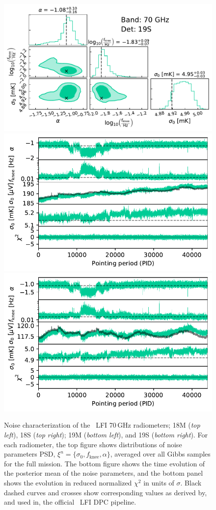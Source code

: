 \documentclass{aa}
\begin{document}
\begin{figure}[p]
\begin{center}
                \includegraphics[width=0.495\linewidth]{figs/corner_band_070_det_4_mean_new.pdf}\\
                \includegraphics[width=0.495\linewidth]{figs/xi_vs_pid_band_070_det_3_mean_new.pdf}
                \includegraphics[width=0.495\linewidth]{figs/xi_vs_pid_band_070_det_4_mean_new.pdf}
                 \vspace*{-4.9mm}            
        \end{center}
        
        \caption{Noise characterization of the \Planck\ LFI 70\,GHz
                radiometers; 18M (\emph{top left}), 18S (\emph{top right}); 19M
                (\emph{bottom left}), and 19S (\emph{bottom right}). For each
                radiometer, the top figure shows distributions of noise parameters
                PSD, $\xi^n = \{\sigma_0, f_\mathrm{knee}, \alpha\}$, averaged
                over all Gibbs samples for the full mission. The bottom figure
                shows the time evolution of the posterior mean of the noise
                parameters, and the bottom panel shows the evolution in reduced
                normalized $\chi^2$ in units of $\sigma$. Black dashed curves and crosses show corresponding values as derived by, and used in, the
                official \Planck\ LFI DPC pipeline.
                \label{fig:xi_prop_70_1}}
\end{figure}
\end{document}
